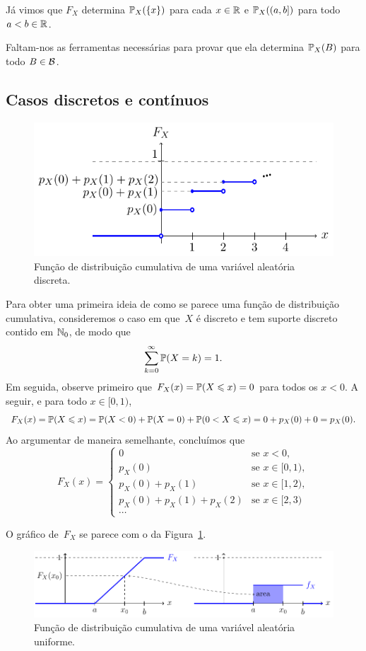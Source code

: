 Já vimos que $ F_X $ determina $ \mathbb{P}_X(\{x\}) $ para cada $ x \in \mathbb{R} $ e $ \mathbb{P}_X((a,b]) $ para todo $ a < b \in \mathbb{R} $.

Faltam-nos as ferramentas necessárias para provar que ela determina $ \mathbb{P}_X(B) $ para todo $ B \in \mathcal B $.

\subsection{Casos discretos e contínuos}

\begin{figure}[b!]
\includegraphics[width=\textwidth]{Pictures/cdfbasic}
\caption{Função de distribuição cumulativa de uma variável aleatória discreta.}
\label{fig:cdfbasic}
\end{figure}

Para obter uma primeira ideia de como se parece uma função de distribuição cumulativa, consideremos o caso em que~$X$ é discreto e tem suporte discreto contido em $\mathbb{N}_0$,
de modo que
\[\sum_{k=0}^\infty \mathbb{P}(X =k) = 1.\]
Em seguida, observe primeiro que
$F_X(x) = \mathbb{P}(X \leqslant x) = 0$
para todos os $ x < 0  $.
A seguir,
e para todo $x \in [0,1)$,
\[F_X(x) = \mathbb{P}(X \leqslant x) = \mathbb{P}(X < 0) + \mathbb{P}(X = 0) + \mathbb{P}(0 < X \leqslant x) = 0 + p_X(0) + 0= p_X(0).\]
Ao argumentar de maneira semelhante, concluímos que
\[F_X(x) = \begin{cases} 0&\text{se } x < 0,\\ p_X(0)&\text{se } x \in [0,1),\\ p_X(0) + p_X(1)&\text{se } x \in [1,2),\\ p_X(0) + p_X(1) + p_X(2)&\text{se } x \in [2,3)\\ \cdots \end{cases}\]

O gráfico de~$F_X$ se parece com o da Figura~\ref{fig:cdfbasic}.

\begin{figure}[t]
\includegraphics[width=\textwidth]{Pictures/uniform}
\caption{Função de distribuição cumulativa de uma variável aleatória uniforme.}
\label{fig:uniform}
\end{figure}

